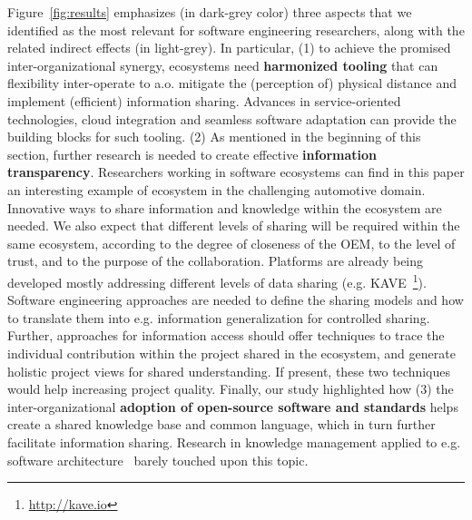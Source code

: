 Figure~\ref{fig:results} emphasizes (in dark-grey color) three aspects that we identified as the most relevant for software engineering researchers, along with the related indirect effects (in light-grey).
In particular, (1) to achieve the promised inter-organizational synergy, ecosystems need {\bf harmonized tooling} that can flexibility inter-operate to a.o. mitigate the (perception of) physical distance and implement (efficient) information sharing. Advances in service-oriented technologies, cloud integration and seamless software adaptation can provide the building blocks for such tooling. (2) As mentioned in the beginning of this section, further research is needed to  create effective {\bf information transparency}. Researchers working in software ecosystems can find in this paper an interesting example of ecosystem in the challenging automotive domain. Innovative ways to share information and knowledge within the ecosystem are needed. %
We also expect that different levels of sharing will be required within the same ecosystem, according to the degree of closeness of the OEM, to the level of trust, and to the purpose of the collaboration. Platforms are already being developed mostly addressing different levels of data sharing (e.g. KAVE~\footnote{\url{http://kave.io}}). Software engineering approaches are needed to define the sharing models and how to translate them into e.g. information generalization for controlled sharing. Further, approaches for information access should offer techniques to trace the individual contribution within the project shared in the ecosystem, and generate holistic project views for shared understanding. If present, these two techniques would help increasing project quality. Finally, our study highlighted how (3) the inter-organizational {\bf adoption of open-source software and standards} helps create a shared knowledge base and common language, which in turn further facilitate information sharing. Research in knowledge management applied to e.g. software architecture~\cite{akmbook} barely touched upon this topic.

% 

